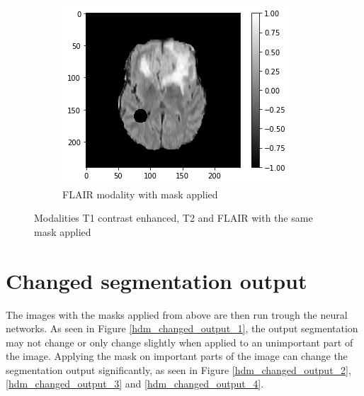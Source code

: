 \begin{figure}[H]
    \begin{subfigure}[t]{.33\textwidth}
        \centering
        \includegraphics[width=\linewidth]{chapters/06_hdm/images_masked/masked_3.png}
        \caption{FLAIR modality with mask applied}
    \end{subfigure}
    \caption{Modalities T1 contrast enhanced, T2 and FLAIR with the same mask applied}
    \label{hdm_masks_2}
\end{figure}



\section{Changed segmentation output}
The images with the masks applied from above are then run trough the neural networks. As seen in Figure \ref{hdm_changed_output_1}, the output segmentation may not change or only change slightly when applied to an unimportant part of the image. Applying the mask on important parts of the image can change the segmentation output significantly, as seen in Figure \ref{hdm_changed_output_2}, \ref{hdm_changed_output_3} and \ref{hdm_changed_output_4}.

